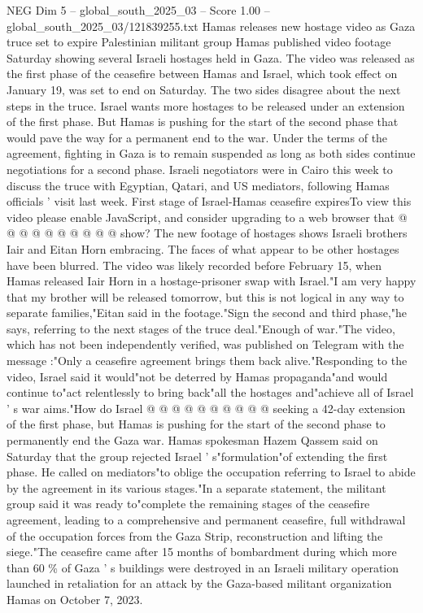 \begin{textsample}{NEG Dim 5 – global\_south\_2025\_03 – Score 1.00 – global\_south\_2025\_03/121839255.txt}  \label{ex:f5_neg_266}
Hamas releases new hostage video as Gaza truce set to expire Palestinian militant group Hamas published video footage Saturday showing several Israeli hostages held in Gaza.
The video was released as the first phase of the ceasefire between Hamas and Israel, which took effect on January 19, was set to end on Saturday.
The two sides disagree about the next steps in the truce.
Israel wants more hostages to be released under an extension of the first phase.
But Hamas is pushing for the start of the second phase that would pave the way for a permanent end to the war.
Under the terms of the agreement, fighting in Gaza is to remain suspended as long as both sides continue negotiations for a second phase.
Israeli negotiators were in Cairo this week to discuss the truce with Egyptian, Qatari, and US mediators, following Hamas officials ' visit last week.
First stage of Israel-Hamas ceasefire expiresTo view this video please enable JavaScript, and consider upgrading to a web browser that @ @ @ @ @ @ @ @ @ @ show?
The new footage of hostages shows Israeli brothers Iair and Eitan Horn embracing.
The faces of what appear to be other hostages have been blurred.
The video was likely recorded before February 15, when Hamas released Iair Horn in a hostage-prisoner swap with Israel."I am very happy that my brother will be released tomorrow, but this is not logical in any way to separate families,"Eitan said in the footage."Sign the second and third phase,"he says, referring to the next stages of the truce deal."Enough of war."The video, which has not been independently verified, was published on Telegram with the message :"Only a ceasefire agreement brings them back alive."Responding to the video, Israel said it would"not be deterred by Hamas propaganda"and would continue to"act relentlessly to bring back"all the hostages and"achieve all of Israel ' s war aims."How do Israel @ @ @ @ @ @ @ @ @ @ seeking a 42-day extension of the first phase, but Hamas is pushing for the start of the second phase to permanently end the Gaza war.
Hamas spokesman Hazem Qassem said on Saturday that the group rejected Israel ' s"formulation"of extending the first phase.
He called on mediators"to oblige the occupation referring to Israel to abide by the agreement in its various stages."In a separate statement, the militant group said it was ready to"complete the remaining stages of the ceasefire agreement, leading to a comprehensive and permanent ceasefire, full withdrawal of the occupation forces from the Gaza Strip, reconstruction and lifting the siege."The ceasefire came after 15 months of bombardment during which more than 60 \% of Gaza ' s buildings were destroyed in an Israeli military operation launched in retaliation for an attack by the Gaza-based militant organization Hamas on October 7, 2023.

\end{textsample}
